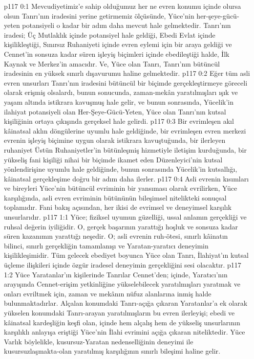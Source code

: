 \vs p117 0:1 Mevcudiyetimiz’e sahip olduğumuz her ne evren konumu içinde olursa olsun Tanrı’nın iradesini yerine getirmemiz ölçüsünde, Yüce’nin her\hyp{}şeye\hyp{}gücü\hyp{}yeten potansiyeli o kadar bir adım daha mevcut hale gelmektedir. Tanrı’nın iradesi; Üç Mutlaklık içinde potansiyel hale geldiği, Ebedi Evlat içinde kişilikleştiği, Sınırsız Ruhaniyeti içinde evren eylemi için bir araya geldiği ve Cennet’in sonsuza kadar süren işleyiş biçimleri içinde ebedileştiği halde, İlk Kaynak ve Merkez’in amacıdır. Ve, Yüce olan Tanrı, Tanrı’nın bütüncül iradesinin en yüksek sınırlı dışavurumu haline gelmektedir.
\vs p117 0:2 Eğer tüm asli evren unsurları Tanrı’nın iradesini bütüncül bir biçimde gerçekleştirmeye göreceli olarak erişmiş olsalardı, bunun sonucunda, zaman\hyp{}mekân yaratılmışları ışık ve yaşam altında istikrara kavuşmuş hale gelir, ve bunun sonrasında, Yücelik’in ilahiyat potansiyeli olan Her\hyp{}Şeye\hyp{}Gücü\hyp{}Yeten, Yüce olan Tanrı’nın kutsal kişiliğinin ortaya çıkışında gerçeksel hale gelirdi.
\vs p117 0:3 Bir evrimleşen akıl kâinatsal aklın döngülerine uyumlu hale geldiğinde, bir evrimleşen evren merkezi evrenin işleyiş biçimine uygun olarak istikrara kavuştuğunda, bir ilerleyen ruhaniyet Üstün Ruhaniyetler’in bütünleşmiş hizmetiyle iletişim kurduğunda, bir yükseliş fani kişiliği nihai bir biçimde ikamet eden Düzenleyici’nin kutsal yönlendirişine uyumlu hale geldiğinde, bunun sonrasında Yücelik’in kutsallığı, kâinatsal gerçekleşime doğru bir adım daha ilerler.
\vs p117 0:4 Asli evrenin kısımları ve bireyleri Yüce’nin bütüncül evriminin bir yansıması olarak evrilirken, Yüce karşılığında, asli evren evriminin bütününün bileşimsel nitelikteki sonuçsal toplamıdır. Fani bakış açısından, her ikisi de evrimsel ve deneyimsel karşılık unsurlarıdır.
\vs p117 1:1 Yüce; fiziksel uyumun güzelliği, ussal anlamın gerçekliği ve ruhsal değerin iyiliğidir. O, gerçek başarının yarattığı hoşluk ve sonsuza kadar süren kazanımın yarattığı neşedir. O; asli evrenin ruh\hyp{}ötesi, sınırlı kâinatın bilinci, sınırlı gerçekliğin tamamlanışı ve Yaratan\hyp{}yaratıcı deneyimin kişilikleşimidir. Tüm gelecek ebediyet boyunca Yüce olan Tanrı, İlahiyat’ın kutsal üçleme ilişkileri içinde özgür iradesel deneyimin gerçekliğini sesi olacaktır.
\vs p117 1:2 Yüce Yaratanlar’ın kişilerinde Tanrılar Cennet’den; içinde, Yaratıcı’nın arayışında Cennet\hyp{}erişim yetkinliğine yükselebilecek yaratılmışları yaratmak ve onları evriltmek için, zaman ve mekânın nüfuz alanlarına inmiş halde bulunmaktadırlar. Alçalan konumdaki Tanrı\hyp{}açığa çıkaran Yaratanlar’a ek olarak yükselen konumdaki Tanrı\hyp{}arayan yaratılmışların bu evren ilerleyişi; ebedi ve kâinatsal kardeşliğin keşfi olan, içinde hem alçalış hem de yükseliş unsurlarının karşılıklı anlayışa eriştiği Yüce’nin İlahi evrimini açığa çıkaran niteliktedir. Yüce Varlık böylelikle, kusursuz\hyp{}Yaratan nedenselliğinin deneyimi ile kusursuzlaşmakta\hyp{}olan yaratılmış karşılığının sınırlı bileşimi haline gelir.
